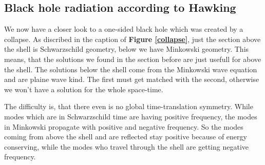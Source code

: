 \subsection{Black hole radiation according to Hawking \checkmark} 
	We now have a closer look to a one-sided black hole which was created by a collapse. As discribed in the caption of \textbf{Figure \ref{collapse}}, just the section above the shell is Schwarzschild geometry, below we have Minkowski geometry. This means, that the solutions we found in the section before are just usefull for above the shell. The solutions below the shell come from the Minkowski wave equation and are plaine wave kind. The first must get matched with the second, otherwise we won't have a solution for the whole space-time.
	
	The difficulty is, that there even is no global time-translation symmetry. While modes which are in Schwarzschild time are having positive frequency, the modes in Minkowski propagate with positive and negative frequency. So the modes coming from above the shell and are reflected stay positive because of energy conserving, while the modes who travel through the shell are getting negative frequency. 
	
